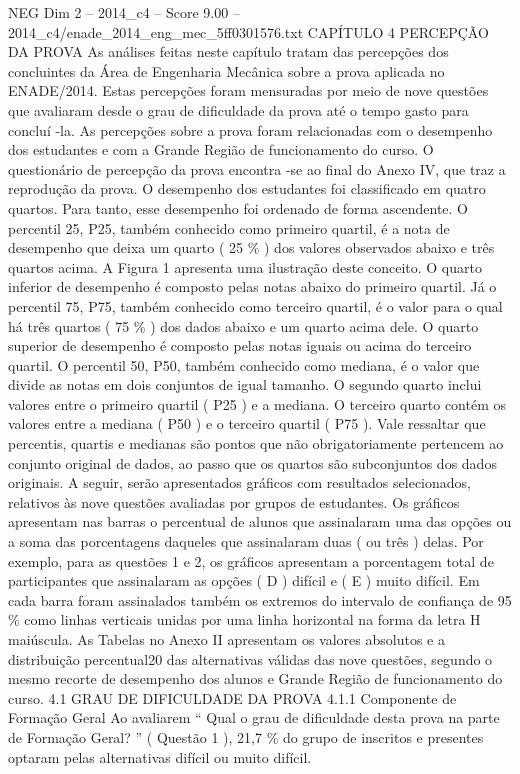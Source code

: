 \begin{textsample}{NEG Dim 2 – 2014\_c4 – Score 9.00 – 2014\_c4/enade\_2014\_eng\_mec\_5ff0301576.txt}  \label{ex:f2_neg_318}
CAPÍTULO 4 PERCEPÇÃO DA PROVA As análises feitas neste capítulo tratam das percepções dos concluintes da Área de Engenharia Mecânica sobre a prova aplicada no ENADE/2014.
Estas percepções foram mensuradas por meio de nove questões que avaliaram desde o grau de dificuldade da prova até o tempo gasto para concluí -la.
As percepções sobre a prova foram relacionadas com o desempenho dos estudantes e com a Grande Região de funcionamento do curso.
O questionário de percepção da prova encontra -se ao final do Anexo IV, que traz a reprodução da prova.
O desempenho dos estudantes foi classificado em quatro quartos.
Para tanto, esse desempenho foi ordenado de forma ascendente.
O percentil 25, P25, também conhecido como primeiro quartil, é a nota de desempenho que deixa um quarto ( 25 \% ) dos valores observados abaixo e três quartos acima.
A Figura 1 apresenta uma ilustração deste conceito.
O quarto inferior de desempenho é composto pelas notas abaixo do primeiro quartil.
Já o percentil 75, P75, também conhecido como terceiro quartil, é o valor para o qual há três quartos ( 75 \% ) dos dados abaixo e um quarto acima dele.
O quarto superior de desempenho é composto pelas notas iguais ou acima do terceiro quartil.
O percentil 50, P50, também conhecido como mediana, é o valor que divide as notas em dois conjuntos de igual tamanho.
O segundo quarto inclui valores entre o primeiro quartil ( P25 ) e a mediana.
O terceiro quarto contém os valores entre a mediana ( P50 ) e o terceiro quartil ( P75 ).
Vale ressaltar que percentis, quartis e medianas são pontos que não obrigatoriamente pertencem ao conjunto original de dados, ao passo que os quartos são subconjuntos dos dados originais.
A seguir, serão apresentados gráficos com resultados selecionados, relativos às nove questões avaliadas por grupos de estudantes.
Os gráficos apresentam nas barras o percentual de alunos que assinalaram uma das opções ou a soma das porcentagens daqueles que assinalaram duas ( ou três ) delas.
Por exemplo, para as questões 1 e 2, os gráficos apresentam a porcentagem total de participantes que assinalaram as opções ( D ) difícil e ( E ) muito difícil.
Em cada barra foram assinalados também os extremos do intervalo de confiança de 95 \% como linhas verticais unidas por uma linha horizontal na forma da letra H maiúscula.
As Tabelas no Anexo II apresentam os valores absolutos e a distribuição percentual20 das alternativas válidas das nove questões, segundo o mesmo recorte de desempenho dos alunos e Grande Região de funcionamento do curso. 4.1 GRAU DE DIFICULDADE DA PROVA 4.1.1 Componente de Formação Geral Ao avaliarem “ Qual o grau de dificuldade desta prova na parte de Formação Geral? ” ( Questão 1 ), 21,7 \% do grupo de inscritos e presentes optaram pelas alternativas difícil ou muito difícil.

\end{textsample}
